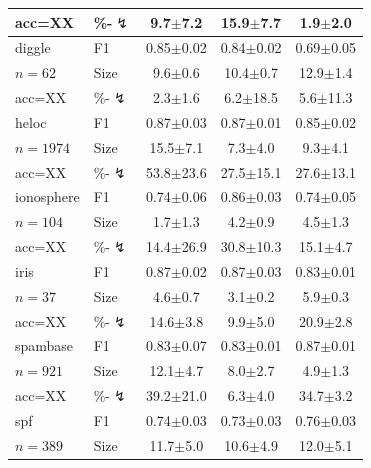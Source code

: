 \begin{tabular}{llccc}
acc=XX & \%-$\lightning$ & 9.7{\scriptsize$\pm$7.2} & 15.9{\scriptsize$\pm$7.7} & 1.9{\scriptsize$\pm$2.0} \\
\midrule
diggle & F1 & 0.85{\scriptsize$\pm$0.02} & 0.84{\scriptsize$\pm$0.02} & 0.69{\scriptsize$\pm$0.05} \\
$n=62$ & Size & 9.6{\scriptsize$\pm$0.6} & 10.4{\scriptsize$\pm$0.7} & 12.9{\scriptsize$\pm$1.4} \\
acc=XX & \%-$\lightning$ & 2.3{\scriptsize$\pm$1.6} & 6.2{\scriptsize$\pm$18.5} & 5.6{\scriptsize$\pm$11.3} \\
\midrule
heloc & F1 & 0.87{\scriptsize$\pm$0.03} & 0.87{\scriptsize$\pm$0.01} & 0.85{\scriptsize$\pm$0.02} \\
$n=1974$ & Size & 15.5{\scriptsize$\pm$7.1} & 7.3{\scriptsize$\pm$4.0} & 9.3{\scriptsize$\pm$4.1} \\
acc=XX & \%-$\lightning$ & 53.8{\scriptsize$\pm$23.6} & 27.5{\scriptsize$\pm$15.1} & 27.6{\scriptsize$\pm$13.1} \\
\midrule
ionosphere & F1 & 0.74{\scriptsize$\pm$0.06} & 0.86{\scriptsize$\pm$0.03} & 0.74{\scriptsize$\pm$0.05} \\
$n=104$ & Size & 1.7{\scriptsize$\pm$1.3} & 4.2{\scriptsize$\pm$0.9} & 4.5{\scriptsize$\pm$1.3} \\
acc=XX & \%-$\lightning$ & 14.4{\scriptsize$\pm$26.9} & 30.8{\scriptsize$\pm$10.3} & 15.1{\scriptsize$\pm$4.7} \\
\midrule
iris & F1 & 0.87{\scriptsize$\pm$0.02} & 0.87{\scriptsize$\pm$0.03} & 0.83{\scriptsize$\pm$0.01} \\
$n=37$ & Size & 4.6{\scriptsize$\pm$0.7} & 3.1{\scriptsize$\pm$0.2} & 5.9{\scriptsize$\pm$0.3} \\
acc=XX & \%-$\lightning$ & 14.6{\scriptsize$\pm$3.8} & 9.9{\scriptsize$\pm$5.0} & 20.9{\scriptsize$\pm$2.8} \\
\midrule
spambase & F1 & 0.83{\scriptsize$\pm$0.07} & 0.83{\scriptsize$\pm$0.01} & 0.87{\scriptsize$\pm$0.01} \\
$n=921$ & Size & 12.1{\scriptsize$\pm$4.7} & 8.0{\scriptsize$\pm$2.7} & 4.9{\scriptsize$\pm$1.3} \\
acc=XX & \%-$\lightning$ & 39.2{\scriptsize$\pm$21.0} & 6.3{\scriptsize$\pm$4.0} & 34.7{\scriptsize$\pm$3.2} \\
\midrule
spf & F1 & 0.74{\scriptsize$\pm$0.03} & 0.73{\scriptsize$\pm$0.03} & 0.76{\scriptsize$\pm$0.03} \\
$n=389$ & Size & 11.7{\scriptsize$\pm$5.0} & 10.6{\scriptsize$\pm$4.9} & 12.0{\scriptsize$\pm$5.1} \\

\end{tabular}
